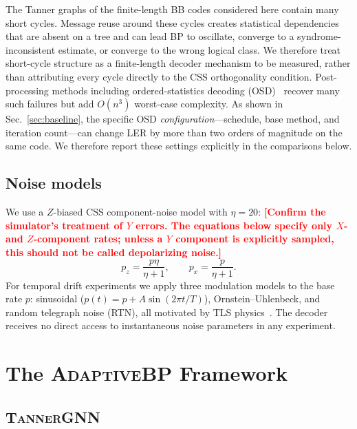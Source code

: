 \documentclass[a4paper,twocolumn,11pt,nopdfoutputerror]{quantumarticle}
\newcommand{\pending}[1]{\textcolor{red}{\textbf{[#1]}}}
\begin{document}
The Tanner graphs of the finite-length BB codes considered here contain
many short cycles. Message reuse around these cycles creates statistical
dependencies that are absent on a tree and can lead BP to oscillate,
converge to a syndrome-inconsistent estimate, or converge to the wrong
logical class. We therefore treat short-cycle structure as a finite-length
decoder mechanism to be measured, rather than attributing every cycle
directly to the CSS orthogonality condition. Post-processing methods
including ordered-statistics decoding (OSD)~\cite{Fossorier1995OSD}
recover many such failures but add $O(n^3)$ worst-case complexity.
As shown in Sec.~\ref{sec:baseline}, the specific OSD
\emph{configuration}---schedule, base method, and iteration count---can
change LER by more than two orders of magnitude on the same code. We
therefore report these settings explicitly in the comparisons below.

\subsection{Noise models}\label{sec:noise}

We use a $Z$-biased CSS component-noise model with $\eta = 20$:
\pending{Confirm the simulator's treatment of $Y$ errors. The equations
below specify only $X$- and $Z$-component rates; unless a $Y$ component
is explicitly sampled, this should not be called depolarizing noise.}
\begin{equation}
p_z = \frac{p\eta}{\eta+1}, \qquad p_x = \frac{p}{\eta+1}.
\label{eq:bias}
\end{equation}
For temporal drift experiments we apply three modulation models
to the base rate $p$: sinusoidal ($p(t) = p + A\sin(2\pi t/T)$),
Ornstein--Uhlenbeck, and random telegraph noise (RTN), all
motivated by TLS physics~\cite{Klimov2018,Carroll2022}. The decoder
receives no direct access to instantaneous noise parameters in any
experiment.

\section{The \textsc{AdaptiveBP} Framework}\label{sec:methods}

\subsection{\textsc{TannerGNN}}\label{sec:tannergnn}
\end{document}
